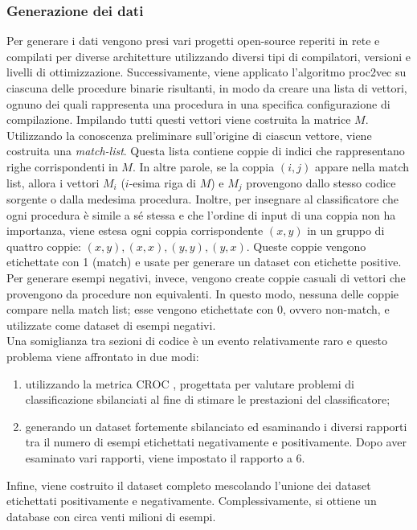 \documentclass[12pt,a4paper,openright,twoside]{report}
\begin{document}
\subsubsection{Generazione dei dati}
Per generare i dati vengono presi vari progetti open-source reperiti in rete e compilati per diverse architetture utilizzando diversi tipi di compilatori, versioni e livelli di ottimizzazione. Successivamente, viene applicato l'algoritmo proc2vec su ciascuna delle procedure binarie risultanti, in modo da creare una lista di vettori, ognuno dei quali rappresenta una procedura in una specifica configurazione di compilazione. Impilando tutti questi vettori viene costruita la matrice $M$.\\
Utilizzando la conoscenza preliminare sull'origine di ciascun vettore, viene costruita una \textit{match-list}. Questa lista contiene coppie di indici che rappresentano righe corrispondenti in $M$. In altre parole, se la coppia $(i,j)$ appare nella match list, allora i vettori $M_i$ ($i$-esima riga di $M$) e $M_j$ provengono dallo stesso codice sorgente o dalla medesima procedura. Inoltre, per insegnare al classificatore che ogni procedura è simile a sé stessa e che l'ordine di input di una coppia non ha importanza, viene estesa ogni coppia corrispondente $(x,y)$ in un gruppo di quattro coppie: $(x,y), (x,x), (y,y), (y,x)$. Queste coppie vengono etichettate con 1 (match) e usate per generare un dataset con etichette positive.\\
Per generare esempi negativi, invece, vengono create coppie casuali di vettori che provengono da procedure non equivalenti. In questo modo, nessuna delle coppie compare nella match list; esse vengono etichettate con 0, ovvero non-match,  e utilizzate come dataset di esempi negativi.\\
Una somiglianza tra sezioni di codice è un evento relativamente raro e questo problema viene affrontato in due modi:
\begin{enumerate}
    \item utilizzando la metrica CROC \cite{croc}, progettata per valutare problemi di classificazione sbilanciati al fine di stimare le prestazioni del classificatore;
    \item generando un dataset fortemente sbilanciato ed esaminando i diversi rapporti tra il numero di esempi etichettati negativamente e positivamente. Dopo aver esaminato vari rapporti, viene impostato il rapporto a 6.
\end{enumerate}
Infine, viene costruito il dataset completo mescolando l'unione dei dataset etichettati positivamente e negativamente. Complessivamente, si ottiene un database con circa venti milioni di esempi.
\end{document}
